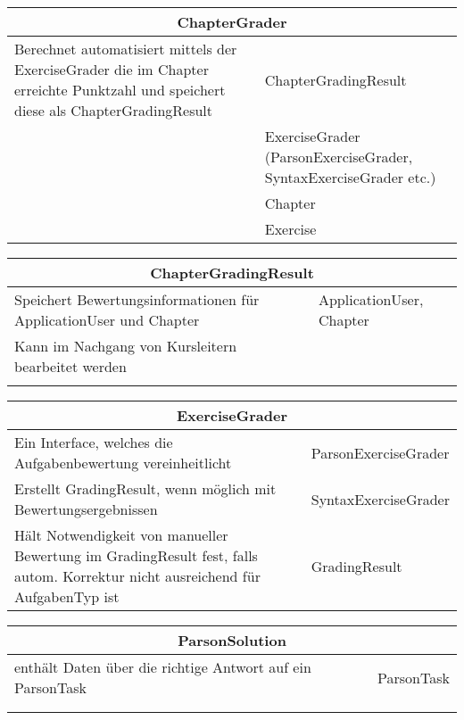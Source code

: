 \documentclass[11pt]{article}
\begin{document}
\begin{table}[h]
\begin{tabularx}{\textwidth}{|X|X|}
\hline
\multicolumn{2}{|c|}{ChapterGrader}\\ \hline
Berechnet automatisiert mittels der ExerciseGrader die im Chapter erreichte Punktzahl und speichert diese als ChapterGradingResult & ChapterGradingResult \\  \hline
& ExerciseGrader (ParsonExerciseGrader, SyntaxExerciseGrader etc.)\\ \hline
 & Chapter\\ \hline
 & Exercise  \\
\end{tabularx}
\end{table}

\begin{table}[h]
\begin{tabularx}{\textwidth}{|X|X|}
\hline
\multicolumn{2}{|c|}{ChapterGradingResult}\\ \hline
Speichert Bewertungsinformationen für ApplicationUser und Chapter& ApplicationUser, Chapter \\  \hline
Kann im Nachgang von Kursleitern bearbeitet werden& \\ \hline
& \\
\end{tabularx}
\end{table}

%
\begin{table}[h]
\begin{tabularx}{\textwidth}{|X|X|}
\hline
\multicolumn{2}{|c|}{ExerciseGrader}\\ \hline
Ein Interface, welches die Aufgabenbewertung vereinheitlicht & ParsonExerciseGrader  \\  \hline
Erstellt GradingResult, wenn möglich mit Bewertungsergebnissen &SyntaxExerciseGrader \\ \hline
Hält Notwendigkeit von manueller Bewertung im GradingResult fest, falls autom. Korrektur nicht ausreichend für AufgabenTyp ist & GradingResult\\ \hline
\end{tabularx}
\end{table}

\begin{table}[h]
\begin{tabularx}{\textwidth}{|X|X|}
\hline
\multicolumn{2}{|c|}{ParsonSolution}\\ \hline
enthält Daten über die richtige Antwort auf ein ParsonTask & ParsonTask \\ \hline
& \\ \hline
& \\ \hline
\end{tabularx}
\end{table}
\end{document}
